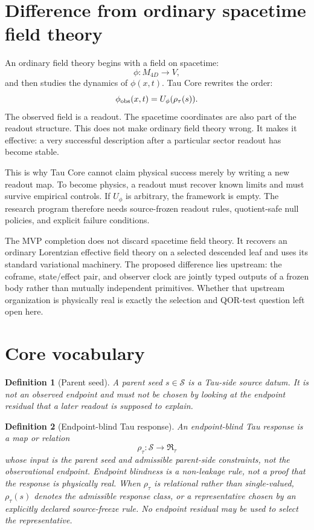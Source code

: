 \documentclass[11pt]{article}
\newtheorem{definition}{Definition}
\newcommand{\Ssrc}{\mathcal S}
\newcommand{\RTspace}{\mathfrak R_{\tau}}
\newcommand{\Rmap}{\rho_{\tau}}
\begin{document}
\section{Difference from ordinary spacetime field theory}

An ordinary field theory begins with a field on spacetime:
\begin{equation}
  \phi: M_{4D} \to V,
\end{equation}
and then studies the dynamics of \(\phi(x,t)\).  Tau Core rewrites the order:
\begin{equation}
  \phi_{\rm obs}(x,t)
  =
  U_{\phi}(\Rmap(s)).
  \label{eq:field-readout}
\end{equation}
The observed field is a readout.  The spacetime coordinates are also part of
the readout structure.  This does not make ordinary field theory wrong.  It
makes it effective: a very successful description after a particular sector
readout has become stable.

This is why Tau Core cannot claim physical success merely by writing a new
readout map.  To become physics, a readout must recover known limits and must
survive empirical controls.  If \(U_{\phi}\) is arbitrary, the framework is
empty.  The research program therefore needs source-frozen readout rules,
quotient-safe null policies, and explicit failure conditions.

The MVP completion does not discard spacetime field theory.  It recovers an
ordinary Lorentzian effective field theory on a selected descended leaf and
uses its standard variational machinery.  The proposed difference lies
upstream: the coframe, state/effect pair, and observer clock are jointly typed
outputs of a frozen body rather than mutually independent primitives.  Whether
that upstream organization is physically real is exactly the selection and
QOR-test question left open here.

\section{Core vocabulary}

\begin{definition}[Parent seed]
A parent seed \(s \in \Ssrc\) is a Tau-side source datum.  It is not an
observed endpoint and must not be chosen by looking at the endpoint residual
that a later readout is supposed to explain.
\end{definition}

\begin{definition}[Endpoint-blind Tau response]
An endpoint-blind Tau response is a map or relation
\[
  \Rmap: \Ssrc \to \RTspace
\]
whose input is the parent seed and admissible parent-side constraints, not the
observational endpoint.  Endpoint blindness is a non-leakage rule, not a proof
that the response is physically real.
When \(\Rmap\) is relational rather than single-valued, \(\Rmap(s)\) denotes
the admissible response class, or a representative chosen by an explicitly
declared source-freeze rule.  No endpoint residual may be used to select the
representative.
\end{definition}
\end{document}
